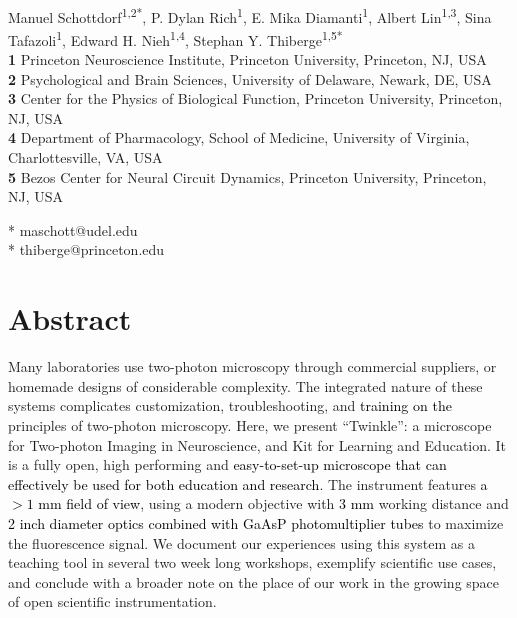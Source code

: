 \documentclass[10pt,letterpaper]{article}
\begin{document}
\vspace*{0.2in}

\begin{flushleft}
{\Large
\textbf{}
}
\newline
\\
Manuel Schottdorf\textsuperscript{1,2*}, %
P. Dylan Rich\textsuperscript{1}, %
E. Mika Diamanti\textsuperscript{1}, %
Albert Lin\textsuperscript{1,3}, %
Sina Tafazoli\textsuperscript{1}, %
Edward H. Nieh\textsuperscript{1,4}, %
Stephan Y. Thiberge\textsuperscript{1,5*} %
\\
\bigskip
\textbf{1} Princeton Neuroscience Institute, Princeton University, Princeton, NJ, USA\\
\textbf{2} Psychological and Brain Sciences, University of Delaware, Newark, DE, USA\\
\textbf{3} Center for the Physics of Biological Function, Princeton University, Princeton, NJ, USA\\
\textbf{4} Department of Pharmacology, School of Medicine, University of Virginia, Charlottesville, VA, USA \\
\textbf{5} Bezos Center for Neural Circuit Dynamics, Princeton University, Princeton, NJ, USA\\
\bigskip

* maschott@udel.edu\\
* thiberge@princeton.edu

\end{flushleft}
\section*{Abstract}
Many laboratories use two-photon microscopy through commercial suppliers, or homemade designs of considerable complexity. The integrated nature of these systems complicates customization, troubleshooting, and \textcolor{black}{training on the} principles of two-photon microscopy. Here, we present ``Twinkle'': a microscope for Two-photon Imaging in Neuroscience, and Kit for Learning and Education. It is a fully open, high performing and \textcolor{black}{easy-to-set-up microscope that can effectively be used for both education and research}. The instrument features \textcolor{black}{a $>1\text{ mm}$ field of view}, using a modern objective with \textcolor{black}{3 mm} working distance and \textcolor{black}{2 inch diameter optics combined with GaAsP photomultiplier tubes} to maximize the fluorescence signal. We document our experiences using this system as a teaching tool in several two week long workshops, exemplify scientific use cases, and conclude with a broader note on the place of our work in the growing space of open scientific instrumentation.
\end{document}

